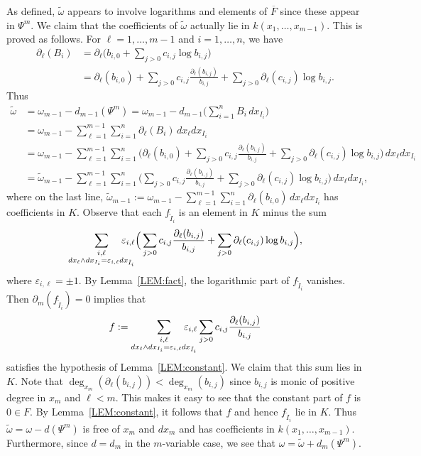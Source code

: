 \documentclass{amsart}
\theoremstyle{definition}
\numberwithin{equation}{section}
\numberwithin{thm}{section}
\begin{document}
As defined, $\widetilde \omega$ appears to involve logarithms and elements of $\overline{F}$ since these appear in $\Psi^m$. We claim that the coefficients of $\widetilde{\omega}$ actually lie in $k(x_1, \ldots, x_{m-1})$.  This is proved as follows.
For $\ell = 1, \ldots, m-1$ and $i=1, \ldots, n$, we have
\begin{align*}
\partial_\ell(B_i) &= \partial_\ell\Big(b_{i, 0} + \sum_{j>0} c_{i, j} \log b_{i, j}\Big)\\
&= \partial_\ell(b_{i, 0}) + \sum_{j>0} c_{i, j} \frac{\partial_\ell(b_{i, j})}{b_{i, j}} + \sum_{j>0} \partial_\ell(c_{i, j}) \log b_{i, j}.
\end{align*}
Thus
\begin{align*}
  \widetilde\omega  &= \omega_{m-1} - d_{m-1}(\Psi^m)  = \omega_{m-1} - d_{m-1}\bigg(\sum_{i=1}^n B_i \,dx_{I_i} \bigg) \\[-7pt]
   &  = \omega_{m-1} - \sum_{\ell=1}^{m-1}\sum_{i=1}^n \partial_\ell(B_i)\,dx_\ell dx_{I_i} \\
   & =  \omega_{m-1} - \sum_{\ell=1}^{m-1}\sum_{i=1}^n \bigg(\partial_\ell(b_{i, 0}) + \sum_{j>0} c_{i, j} \frac{\partial_\ell(b_{i, j})}{b_{i, j}} + \sum_{j>0} \partial_\ell(c_{i, j}) \log b_{i, j}\bigg)\,dx_\ell dx_{I_i} \\
   & = \widetilde{\omega}_{m-1} - \sum_{\ell=1}^{m-1}\sum_{i=1}^n \bigg(
   \sum_{j>0}c_{i,j}\frac{\partial_\ell(b_{i,j})}{b_{i,j}}+
   \sum_{j>0} \partial_\ell(c_{i, j}) \log b_{i, j}\bigg)\,dx_\ell dx_{I_i} ,
\end{align*}
where on the last line, $\widetilde{\omega}_{m-1} :=\omega_{m-1}-\sum_{\ell=1}^{m-1}\sum_{i=1}^{n}\partial_\ell(b_{i,0})\,dx_\ell dx_{I_i}$ has coefficients in $K$.
Observe that each $f_{\tilde I_i}$ is an element in $K$ minus the sum 
\[ 
\sum_{\substack {i, \ell \\ dx_\ell \wedge dx_{I_i} = \varepsilon_{i,\ell}  dx_{\tilde I_i}} }  \hskip-15pt \varepsilon_{i,\ell}  \Big(\sum_{j>0}c_{i,j}\frac{\partial_\ell(b_{i,j})}{b_{i,j}}+
\sum_{j>0} \partial_\ell(c_{i, j}) \log b_{i, j}\Big),
\] 
where $\varepsilon_{i,\ell} = \pm1$.  By Lemma~\ref{LEM:fact}, the logarithmic part of $f_{\tilde I_i}$ vanishes. Then $\partial_{m}(f_{\tilde I_i}) = 0$ implies that 
\[
f:= \sum_{\substack {i, \ell \\ dx_\ell \wedge dx_{I_i} = \varepsilon_{i,\ell} dx_{\tilde I_i}} }  \hskip-15pt \varepsilon_{i,\ell} \sum_{j>0}c_{i,j}\frac{\partial_\ell(b_{i,j})}{b_{i,j}}
\]
satisfies the hypothesis of Lemma~\ref{LEM:constant}. We claim  that  this sum  lies in $K$. Note that $\deg_{x_m}(\partial_{\ell}(b_{i,j})) < \deg_{x_m}(b_{i,j})$ since $b_{i,j}$ is monic  of positive degree in $x_m$ and $\ell < m$.  This makes it easy to see that the constant part of $f$ is $0 \in F$.  By Lemma~\ref{LEM:constant}, it follows that $f$ and hence  $f_{\tilde I_i}$ lie in $K$. Thus $\widetilde{\omega} = \omega - d(\Psi^m)$ is free of $x_m$ and $dx_m$ and has coefficients in $k(x_1,\dots,x_{m-1})$. Furthermore, since $d = d_m$ in the $m$-variable case, we see that $\omega = \widetilde{\omega} + d_m(\Psi^m)$.
\end{document}

